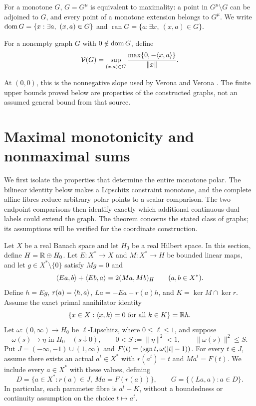 For a monotone $G$, $G=G^\mu$ is equivalent to maximality: a point in
$G^\mu\setminus G$ can be adjoined to $G$, and every point of a monotone
extension belongs to $G^\mu$. We write
$\operatorname{dom} G=\{x:\exists a,\ (x,a)\in G\}$ and
$\operatorname{ran}G=\{a:\exists x,\ (x,a)\in G\}$.


\begin{definition}
For a nonempty graph $G$ with $0\notin\operatorname{dom} G$, define
\begin{equation}
\mathcal V(G)=\sup_{(x,a)\in G}
 \frac{\max\{0,-\langle x,a\rangle\}}{\|x\|}.
\label{eq:D3}
\end{equation}
\end{definition}
At $(0,0)$, this is the nonnegative slope used by Verona and Verona
\cite{verona2008}. The finite upper bounds proved below are properties
of the constructed graphs, not an assumed general bound from that source.

\section{Maximal monotonicity and nonmaximal sums}
\label{sec:endpoint-criterion}
We first isolate the properties that determine the entire monotone polar.
The bilinear identity below makes a Lipschitz constraint monotone, and
the complete affine fibres reduce arbitrary polar points to a scalar
comparison. The two endpoint comparisons then identify exactly which
additional continuous-dual labels could extend the graph. The theorem
concerns the stated class of graphs; its assumptions will be verified
for the coordinate construction.

Let $X$ be a real Banach space and let $H_0$ be a real Hilbert space.
In this section, define $H=\mathbb R\oplus H_0$. Let
$E:X^*\to X$ and $M:X^*\to H$ be bounded linear maps, and let
$g\in X^*\setminus\{0\}$ satisfy $Mg=0$ and
\begin{equation}
\langle Ea,b\rangle+\langle Eb,a\rangle=2(Ma,Mb)_H
\qquad(a,b\in X^*).
\label{eq:abs-bilinear}
\end{equation}
Define $h=Eg$, $r(a)=\langle h,a\rangle$, $La=-Ea+r(a)h$, and
$K=\ker M\cap\ker r$. Assume the exact primal annihilator identity
\begin{equation}
\{x\in X:\langle x,k\rangle=0\ \hbox{for all }k\in K\}=\mathbb R h.
\label{eq:abs-annihilator}
\end{equation}
Let $\omega:(0,\infty)\to H_0$ be $\ell$-Lipschitz, where
$0\le\ell\le1$, and suppose
\begin{equation}
\omega(s)\longrightarrow\eta\text{ in }H_0\quad(s\downarrow0),
\qquad 0<S:=\|\eta\|^2<1,\qquad \|\omega(s)\|^2\le S.
\label{eq:abs-tail}
\end{equation}
Put $J=(-\infty,-1)\cup(1,\infty)$ and
$F(t)=(\operatorname{sgn} t,\omega(|t|-1))$. For every $t\in J$, assume
there exists an actual $a^t\in X^*$ with $r(a^t)=t$ and
$Ma^t=F(t)$. We include every $a\in X^*$ with these values, defining
\begin{equation}
D=\{a\in X^*:r(a)\in J,\ Ma=F(r(a))\},\qquad
G=\{(La,a):a\in D\}.
\label{eq:abs-full-graph}
\end{equation}
In particular, each parameter fibre is $a^t+K$, without a boundedness
or continuity assumption on the choice $t\mapsto a^t$.

